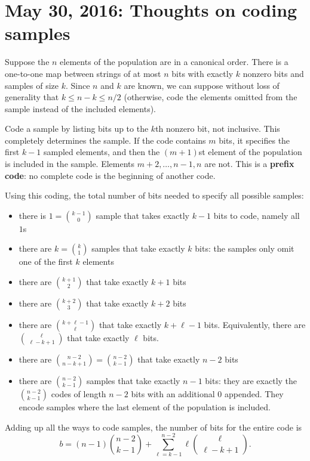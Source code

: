 \documentclass[12pt]{article}
\begin{document}
\section{May 30, 2016: Thoughts on coding samples}

Suppose the $n$ elements of the population are in a canonical order.
There is a one-to-one map between strings of at most $n$ bits with exactly $k$ nonzero bits
and samples of size $k$. 
Since $n$ and $k$ are known, we can suppose without loss of generality that $k \le n-k \le n/2$
(otherwise, code the elements omitted from the sample instead of the included elements).

Code a sample by listing bits up to the $k$th nonzero bit, not inclusive.
This completely determines the sample.
If the code contains $m$ bits, it specifies the first $k-1$ sampled elements, and then the $(m+1)$st element of the population is included in the sample.
Elements $m+2, \dots, n-1, n$ are not.
This is a \textbf{prefix code}: no complete code is the beginning of another code.

Using this coding, the total number of bits needed to specify all possible samples:
\begin{itemize}
\item there is  $1 = {{k-1} \choose {0}}$ sample that takes exactly $k-1$ bits to code, namely all $1$s
\item there are $k = {{k} \choose {1}}$ samples that take exactly $k$ bits: the samples only omit one of the first $k$ elements
\item there are ${{k+1} \choose 2} $ that take exactly $k+1$ bits
\item there are $ {{k+2} \choose 3} $ that take exactly $k+2$ bits
\item there are $ {{k+\ell-1} \choose {\ell}} $ that take exactly $k+\ell-1$ bits. Equivalently, there are ${{\ell} \choose {\ell - k + 1}}$ that take exactly $\ell$ bits.
\item there are $ {{n-2} \choose {n - k+1}} = {{n-2} \choose {k-1}} $ that take exactly $n-2$ bits
\item there are $ {{n-2} \choose {k-1}} $ samples that take exactly $n-1$ bits: they are exactly the $ {{n-2} \choose {k-1}} $ codes of length $n-2$ bits with an additional $0$ appended. They encode samples where the last element of the population is included.
\end{itemize}
Adding up all the ways to code samples, the number of bits for the entire code is
$$ b = (n-1)  {{n-2} \choose {k-1}} + \sum_{\ell=k-1}^{n-2} \ell {{\ell} \choose {\ell-k+1}}.$$
\end{document}
